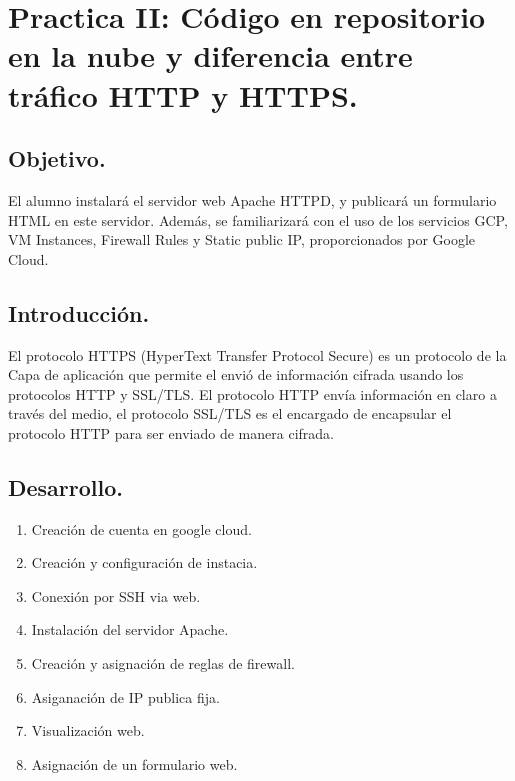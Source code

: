 \documentclass[12pt]{article}
\begin{document}

{\color{red} \section*{\textbf{Practica II: Código en repositorio en la nube y diferencia entre tráfico HTTP y HTTPS.}}}
\vspace{1em}

{\color{blue} \subsection*{\textbf{Objetivo.}}}
\vspace{1em}
El alumno instalará el servidor web Apache HTTPD, y publicará un formulario HTML en este servidor. Además, se familiarizará con el uso de los servicios GCP, VM Instances, Firewall Rules y Static public IP, proporcionados por Google Cloud.
\vspace{2em}

{\color{blue} \subsection*{\textbf{Introducción.}}}
\vspace{1em}
El protocolo HTTPS (HyperText Transfer Protocol Secure) es un protocolo de la Capa de aplicación que permite el envió de información cifrada usando los protocolos HTTP y SSL/TLS. El protocolo HTTP envía información en claro a través del medio, el protocolo SSL/TLS es el encargado de encapsular el protocolo HTTP para ser enviado de manera cifrada.
\vspace{2em}


{\color{blue} \subsection*{\textbf{Desarrollo.}}}
\vspace{1em}
\begin{enumerate}
    \item Creación de cuenta en google cloud.
    \item Creación y configuración de instacia.
    \item Conexión por SSH via web.
    \item Instalación del servidor Apache.
    \item Creación y asignación de reglas de firewall.
    \item Asiganación de IP publica fija.
    \item Visualización web.
    \item Asignación de un formulario web.
\end{enumerate}\\
\end{document}
